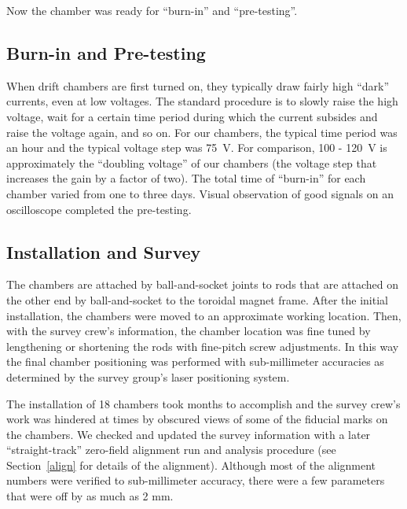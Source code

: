 Now the chamber was ready for ``burn-in'' and ``pre-testing''.

\subsection{Burn-in and Pre-testing}

When drift chambers are first turned on, they typically draw fairly high
``dark'' currents, even at low voltages.  The standard procedure is to
slowly raise the high voltage, wait for a certain time period during
which the current subsides and raise the voltage again, and so on.
For our chambers, the typical time period was an hour and the typical
voltage step was 75~V.  For comparison, 100 - 120~V is approximately the 
``doubling voltage'' of
our chambers (the voltage step that increases the gain by a factor
of two).  The total time of ``burn-in'' for each chamber varied from one to three days.
Visual observation of good signals on an oscilloscope completed
the pre-testing.

\subsection{Installation and Survey}

The chambers are attached by ball-and-socket joints to rods that are attached
on the other end by ball-and-socket to the toroidal magnet frame.
After the initial installation, the chambers were moved to an approximate
working location.  Then, with the survey crew's information, the chamber location
was fine tuned by lengthening or shortening the rods with fine-pitch screw adjustments.
In this way the final chamber positioning was performed with sub-millimeter accuracies as
determined by the survey group's laser positioning system.

The installation of 18 chambers took months to accomplish and the survey crew's work
was hindered at times by obscured views of some of the fiducial marks on the 
chambers.  We checked and updated the survey information with a later 
``straight-track'' zero-field alignment run and analysis procedure (see Section~\ref{align}
for details of the alignment).
Although most of the alignment numbers were verified to sub-millimeter accuracy, there
were a few parameters that were off by as much as 2 mm.


